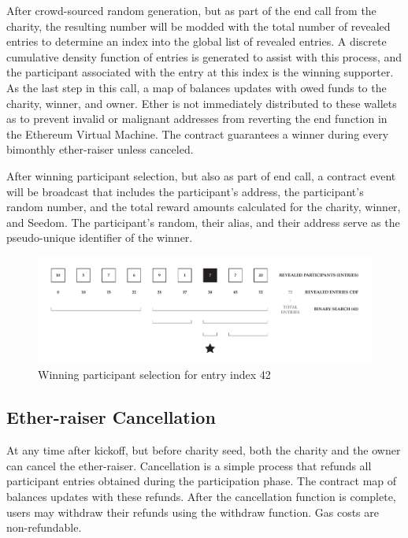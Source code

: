 \documentclass[11pt]{article}
\begin{document}
After crowd-sourced random generation, but as part of the end call from the charity, the resulting number will be modded with the total number of revealed entries to determine an index into the global list of revealed entries. A discrete cumulative density function of entries is generated to assist with this process, and the participant associated with the entry at this index is the winning supporter. As the last step in this call, a map of balances updates with owed funds to the charity, winner, and owner. Ether is not immediately distributed to these wallets as to prevent invalid or malignant addresses from reverting the end function in the Ethereum Virtual Machine. The contract guarantees a winner during every bimonthly ether-raiser unless canceled.

After winning participant selection, but also as part of end call, a contract event will be broadcast that includes the participant's address, the participant's random number, and the total reward amounts calculated for the charity, winner, and Seedom. The participant's random, their alias, and their address serve as the pseudo-unique identifier of the winner.

\begin{figure}[H]
\begin{center}
\includegraphics[width=1.0\textwidth]{winningParticipantSelection.pdf}
\caption{Winning participant selection for entry index 42}
\label{figure:winningParticipantSelection}
\end{center}
\end{figure}

\subsection{Ether-raiser Cancellation}

At any time after kickoff, but before charity seed, both the charity and the owner can cancel the ether-raiser. Cancellation is a simple process that refunds all participant entries obtained during the participation phase. The contract map of balances updates with these refunds. After the cancellation function is complete, users may withdraw their refunds using the withdraw function. Gas costs are non-refundable.
\end{document}
